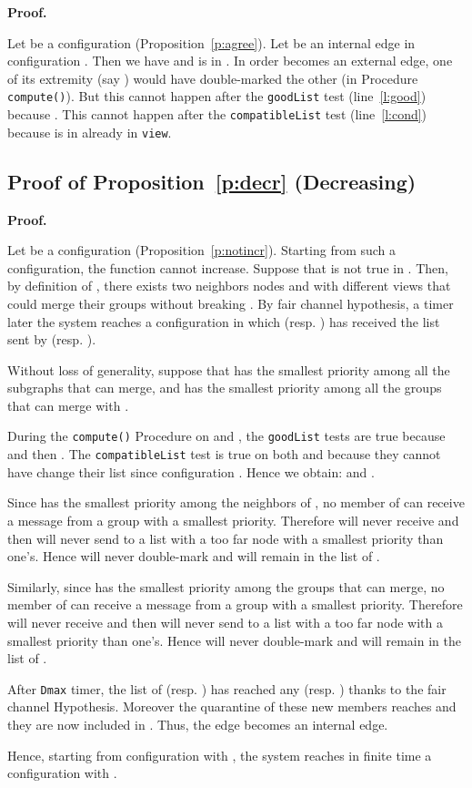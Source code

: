 \documentclass[11pt,english]{article}
\newenvironment{proof}[1][0cm]{
  \begin{list}{\bf Proof.~}{
      \setlength{\itemindent}{0cm}
      \setlength{\labelsep}{0cm}
      \setlength{\labelwidth}{#1}
      \setlength{\leftmargin}{#1}
    \item
    }
}{\hfill
  \end{list}
}
\begin{document}
\begin{proof}
  Let  be a configuration (Proposition~\ref{p:agree}).
  Let  be an internal edge in configuration . Then we have  and  is in .
In order  becomes an external edge, one of its extremity (say )
  would have double-marked the other (in Procedure \texttt{compute()}). But this
  cannot happen after the \texttt{goodList} test (line~\ref{l:good}) because . This cannot happen after the \texttt{compatibleList}
  test (line~\ref{l:cond}) because  is in already in \texttt{view}.
\end{proof}

\subsection{Proof of Proposition~\ref{p:decr} (Decreasing)}

\begin{proof}
  Let  be a configuration
  (Proposition~\ref{p:notincr}). Starting from such a configuration, the 
  function cannot increase.
Suppose that  is not true in . Then, by definition of , there
  exists two neighbors nodes  and  with different views that could merge
  their groups without breaking . By fair channel hypothesis, a timer
  later the system reaches a configuration  in which  (resp. ) has
  received the list sent by  (resp. ).

  Without loss of generality, suppose that  has the smallest priority
  among all the subgraphs that can merge, and  has the smallest priority
  among all the groups that can merge with .

  During the \texttt{compute()} Procedure on  and , the \texttt{goodList}
  tests are true because  and then . The \texttt{compatibleList} test is true on both  and 
  because they cannot have change their list since configuration . Hence we
  obtain:  and .

  Since  has the smallest priority among the neighbors of , no member
  of  can receive a message from a group with a smallest
  priority. Therefore  will never receive and then will never send to  a
  list with a too far node with a smallest priority than  one's. Hence 
  will never double-mark  and  will remain in the list of .

  Similarly, since  has the smallest priority among the groups that can
  merge, no member of  can receive a message from a group with a smallest
  priority. Therefore  will never receive and then will never send to  a
  list with a too far node with a smallest priority than  one's. Hence 
  will never double-mark  and  will remain in the list of .

  After \texttt{Dmax} timer, the list of  (resp. ) has reached any  (resp. ) thanks to the fair channel Hypothesis. Moreover the
  quarantine of these new members reaches  and they are now included in
  . Thus, the edge  becomes an internal edge.

  Hence, starting from configuration  with , the system reaches
  in finite time a configuration  with .
\end{proof}
\end{document}
